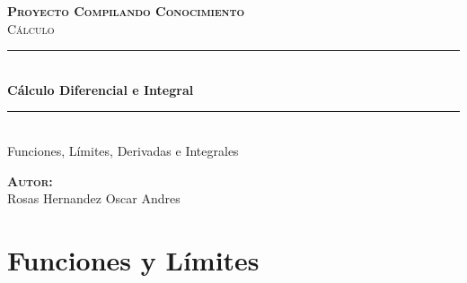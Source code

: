\documentclass[12pt]{report}                                    %
\author{Oscar Andrés Rosas}                                     %
\begin{document}
\begin{titlepage}

    \center
    \textbf{\textsc{\Large Proyecto Compilando Conocimiento}}\\[1.0cm] 
    \textsc{\Large Cálculo}\\[1.0cm] 

    \rule{\linewidth}{0.5mm} \\[1.0cm]
        { \huge \bfseries Cálculo Diferencial e Integral}\\[1.0cm] 
    \rule{\linewidth}{0.5mm} \\[2.0cm]
    
    {\LARGE Funciones, Límites, Derivadas e Integrales}\\[7cm] 
    
    \begin{center} \large
    \textbf{\textsc{Autor:}}\\
    Rosas Hernandez Oscar Andres
    \end{center}

    \vfill

\end{titlepage}

\tableofcontents{}
\label{sec:Index}
\clearpage



\part{Funciones y Límites}


\end{document}
